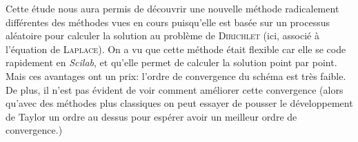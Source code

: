 \documentclass[12pt, a4paper]{article}
\begin{document}
Cette étude nous aura permis de découvrir une nouvelle méthode radicalement différentes des méthodes
vues en cours puisqu'elle est basée sur un processus aléatoire pour calculer la solution au problème
de \textsc{Dirichlet} (ici, associé à l'équation de \textsc{Laplace}). On a vu que cette méthode était flexible car elle se code
rapidement en \emph{Scilab}, et qu'elle permet de calculer la solution point par point. Mais ces
avantages ont un prix: l'ordre de convergence du schéma est très faible. De plus, il n'est pas
évident de voir comment améliorer cette convergence (alors qu'avec des méthodes plus classiques on
peut essayer de pousser le développement de Taylor un ordre au dessus pour espérer avoir un meilleur
ordre de convergence.)
\end{document}
